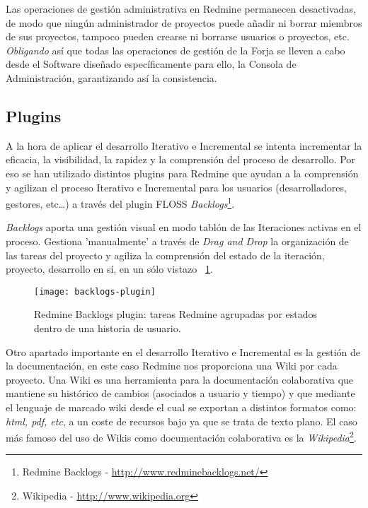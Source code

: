 \par Las operaciones de gestión administrativa en Redmine permanecen desactivadas, de modo que ningún administrador de proyectos puede añadir ni borrar miembros de sus proyectos, tampoco pueden crearse ni borrarse usuarios o proyectos, etc. \emph{Obligando} así que todas las operaciones de gestión de la Forja se lleven a cabo desde el Software diseñado específicamente para ello, la Consola de Administración, garantizando así la consistencia.

\subsection{Plugins}
\label{sub:redmine-plugins}

\par A la hora de aplicar el desarrollo Iterativo e Incremental se intenta incrementar la eficacia, la visibilidad, la rapidez y la comprensión del proceso de desarrollo. Por eso se han utilizado distintos plugins para Redmine que ayudan a la comprensión y agilizan el proceso Iterativo e Incremental para los usuarios (desarrolladores, gestores, etc\ldots) a través del plugin FLOSS \emph{Backlogs}\footnote{Redmine Backlogs - \url{http://www.redminebacklogs.net/}}.

\par \emph{Backlogs} aporta una gestión visual en modo tablón de las Iteraciones activas en el proceso. Gestiona 'manualmente' a través de \emph{Drag and Drop} la organización de las tareas del proyecto y agiliza la comprensión del estado de la iteración, proyecto, desarrollo en sí, en un sólo vistazo ~\ref{fig:backlogs-plugin}.

\begin{figure}[H]
    \centering
    \texttt{[image: backlogs-plugin]}
    \caption{Redmine Backlogs plugin: tareas Redmine agrupadas por estados dentro de una historia de usuario.}
    \label{fig:backlogs-plugin}
\end{figure}

\par Otro apartado importante en el desarrollo Iterativo e Incremental es la gestión de la documentación, en este caso Redmine nos proporciona una Wiki por cada proyecto. Una Wiki es una herramienta para la documentación colaborativa que mantiene su histórico de cambios (asociados a usuario y tiempo) y que mediante el lenguaje de marcado wiki desde el cual se exportan a distintos formatos como: \emph{html, pdf, etc}, a un coste de recursos bajo ya que se trata de texto plano. El caso más famoso del uso de Wikis como documentación colaborativa es la \emph{Wikipedia}\footnote{Wikipedia - \url{http://www.wikipedia.org}}.

